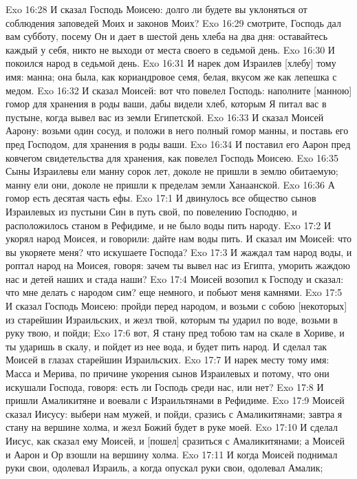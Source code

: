 Exo 16:28  И сказал Господь Моисею: долго ли будете вы уклоняться от соблюдения заповедей Моих и законов Моих?
Exo 16:29  смотрите, Господь дал вам субботу, посему Он и дает в шестой день хлеба на два дня: оставайтесь каждый у себя, никто не выходи от места своего в седьмой день.
Exo 16:30  И покоился народ в седьмой день.
Exo 16:31  И нарек дом Израилев [хлебу] тому имя: манна; она была, как кориандровое семя, белая, вкусом же как лепешка с медом.
Exo 16:32  И сказал Моисей: вот что повелел Господь: наполните [манною] гомор для хранения в роды ваши, дабы видели хлеб, которым Я питал вас в пустыне, когда вывел вас из земли Египетской.
Exo 16:33  И сказал Моисей Аарону: возьми один сосуд, и положи в него полный гомор манны, и поставь его пред Господом, для хранения в роды ваши.
Exo 16:34  И поставил его Аарон пред ковчегом свидетельства для хранения, как повелел Господь Моисею.
Exo 16:35  Сыны Израилевы ели манну сорок лет, доколе не пришли в землю обитаемую; манну ели они, доколе не пришли к пределам земли Ханаанской.
Exo 16:36  А гомор есть десятая часть ефы.
Exo 17:1  И двинулось все общество сынов Израилевых из пустыни Син в путь свой, по повелению Господню, и расположилось станом в Рефидиме, и не было воды пить народу.
Exo 17:2  И укорял народ Моисея, и говорили: дайте нам воды пить. И сказал им Моисей: что вы укоряете меня? что искушаете Господа?
Exo 17:3  И жаждал там народ воды, и роптал народ на Моисея, говоря: зачем ты вывел нас из Египта, уморить жаждою нас и детей наших и стада наши?
Exo 17:4  Моисей возопил к Господу и сказал: что мне делать с народом сим? еще немного, и побьют меня камнями.
Exo 17:5  И сказал Господь Моисею: пройди перед народом, и возьми с собою [некоторых] из старейшин Израильских, и жезл твой, которым ты ударил по воде, возьми в руку твою, и пойди;
Exo 17:6  вот, Я стану пред тобою там на скале в Хориве, и ты ударишь в скалу, и пойдет из нее вода, и будет пить народ. И сделал так Моисей в глазах старейшин Израильских.
Exo 17:7  И нарек месту тому имя: Масса и Мерива, по причине укорения сынов Израилевых и потому, что они искушали Господа, говоря: есть ли Господь среди нас, или нет?
Exo 17:8  И пришли Амаликитяне и воевали с Израильтянами в Рефидиме.
Exo 17:9  Моисей сказал Иисусу: выбери нам мужей, и пойди, сразись с Амаликитянами; завтра я стану на вершине холма, и жезл Божий будет в руке моей.
Exo 17:10  И сделал Иисус, как сказал ему Моисей, и [пошел] сразиться с Амаликитянами; а Моисей и Аарон и Ор взошли на вершину холма.
Exo 17:11  И когда Моисей поднимал руки свои, одолевал Израиль, а когда опускал руки свои, одолевал Амалик;
